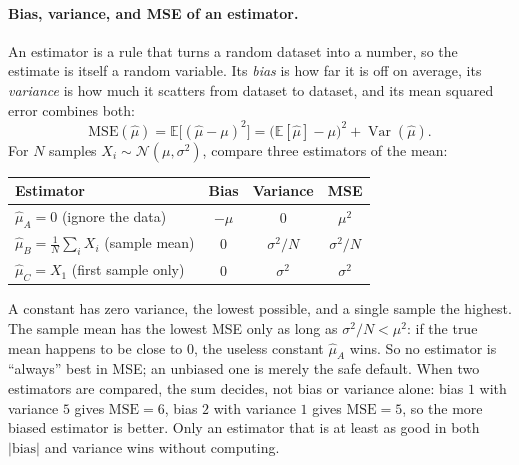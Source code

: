 \paragraph{Bias, variance, and MSE of an estimator.}
An estimator is a rule that turns a random dataset into a number, so the
estimate is itself a random variable. Its \emph{bias} is how far it is off on
average, its \emph{variance} is how much it scatters from dataset to dataset,
and its mean squared error combines both:
\begin{equation}
  \mathrm{MSE}(\hat\mu) = \mathbb{E}\bigl[(\hat\mu-\mu)^2\bigr]
  = \bigl(\mathbb{E}[\hat\mu]-\mu\bigr)^2 + \operatorname{Var}(\hat\mu).
\end{equation}
\noindent
For $N$ samples $X_i\sim\mathcal N(\mu,\sigma^2)$, compare three estimators of
the mean:
\begin{center}
  \begin{tabular}{@{}lccc@{}}
    \toprule
    Estimator & Bias & Variance & MSE \\
    \midrule
    $\hat\mu_A = 0$ (ignore the data) & $-\mu$ & $0$ & $\mu^2$ \\
    $\hat\mu_B = \frac1N\sum_i X_i$ (sample mean) & $0$ & $\sigma^2/N$ & $\sigma^2/N$ \\
    $\hat\mu_C = X_1$ (first sample only) & $0$ & $\sigma^2$ & $\sigma^2$ \\
    \bottomrule
  \end{tabular}
\end{center}
\noindent
A constant has zero variance, the lowest possible, and a single sample the
highest. The sample mean has the lowest MSE only as long as
$\sigma^2/N < \mu^2$: if the true mean happens to be close to $0$, the useless
constant $\hat\mu_A$ wins. So no estimator is ``always'' best in MSE; an
unbiased one is merely the safe default. When two estimators are compared, the
sum decides, not bias or variance alone: bias $1$ with variance $5$ gives
$\mathrm{MSE}=6$, bias $2$ with variance $1$ gives $\mathrm{MSE}=5$, so the more
biased estimator is better. Only an estimator that is at least as good in both
$\lvert\text{bias}\rvert$ and variance wins without computing.

